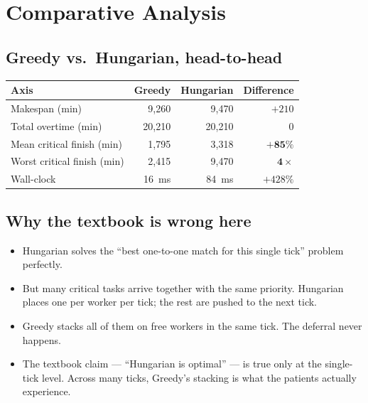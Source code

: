 \section{Comparative Analysis}
\label{sec:comparative}

\subsection{Greedy vs.\ Hungarian, head-to-head}

\begin{table}[H]
\centering
\small
\begin{tabular}{l r r r}
\toprule
\textbf{Axis} & \textbf{Greedy} & \textbf{Hungarian} & \textbf{Difference} \\
\midrule
Makespan (min)             & 9{,}260 & 9{,}470 & $+210$ \\
Total overtime (min)       & 20{,}210 & 20{,}210 & 0 \\
Mean critical finish (min) & 1{,}795 & 3{,}318 & $\bm{+85\%}$ \\
Worst critical finish (min)& 2{,}415 & 9{,}470 & $\bm{4\times}$ \\
Wall-clock                 & 16~ms   & 84~ms   & $+428\%$ \\
\bottomrule
\end{tabular}
\end{table}

\subsection{Why the textbook is wrong here}

\begin{itemize}
  \item Hungarian solves the ``best one-to-one match for this
        single tick'' problem perfectly.
  \item But many critical tasks arrive together with the same
        priority. Hungarian places one per worker per tick;
        the rest are pushed to the next tick.
  \item Greedy stacks all of them on free workers in the same
        tick. The deferral never happens.
  \item The textbook claim --- ``Hungarian is optimal'' --- is true
        only at the single-tick level. Across many ticks, Greedy's
        stacking is what the patients actually experience.
\end{itemize}

